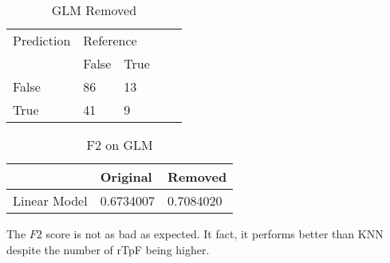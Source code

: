 \begin{table}[!htbp]
\centering
\caption{GLM Removed}
\vspace{0.1cm}
\label{glm-remov}
\begin{tabular}{|l|ll|ll}
\cline{1-3}
Prediction & \multicolumn{2}{l|}{Reference} &  &  \\
           & False          & True          &  &  \\ \cline{2-3}
False      & 86              & 13             &  &  \\
True       & 41              & 9             &  &  \\ \cline{1-3}
\end{tabular}
\end{table}

\begin{table}[!htbp]
\centering
\caption{F2 on GLM}
\vspace{0.1cm}
\label{glm-f2}
\begin{tabular}{|l|l|l|}
\hline
      & Original & Removed \\ \hline
Linear Model & 0.6734007 & 0.7084020       \\ \hline
\end{tabular}
\end{table}


The $F2$ score is not as bad as expected. It fact, it performs better than KNN despite the number of rTpF being higher.








